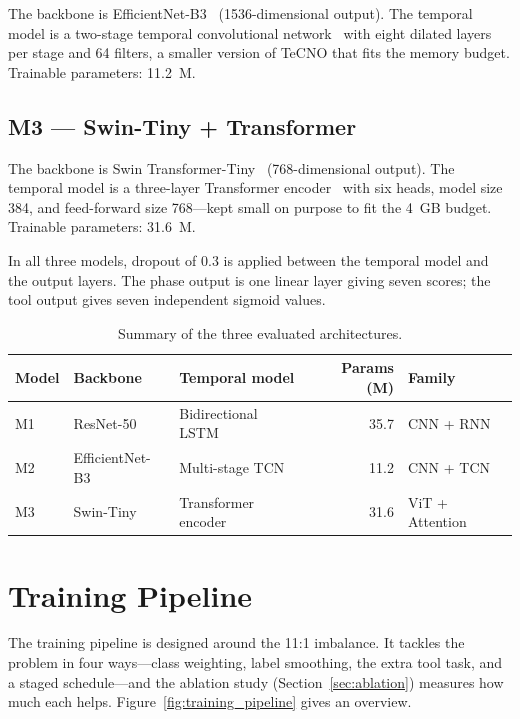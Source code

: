 The backbone is EfficientNet-B3~\cite{tan2019efficientnet} (1536-dimensional output). The temporal model is a two-stage temporal convolutional network~\cite{czempiel2020tecno} with eight dilated layers per stage and 64 filters, a smaller version of TeCNO that fits the memory budget. Trainable parameters: 11.2~M.

\subsection{M3 --- Swin-Tiny + Transformer}

The backbone is Swin Transformer-Tiny~\cite{liu2021swin} (768-dimensional output). The temporal model is a three-layer Transformer encoder~\cite{vaswani2017attention} with six heads, model size 384, and feed-forward size 768---kept small on purpose to fit the 4~GB budget. Trainable parameters: 31.6~M.

In all three models, dropout of 0.3 is applied between the temporal model and the output layers. The phase output is one linear layer giving seven scores; the tool output gives seven independent sigmoid values.

\begin{table}[H]
\centering
\caption{Summary of the three evaluated architectures.}
\label{tab:architectures}
\begin{tabular}{lllrl}
\toprule
\textbf{Model} & \textbf{Backbone} & \textbf{Temporal model} & \textbf{Params (M)} & \textbf{Family} \\
\midrule
M1 & ResNet-50      & Bidirectional LSTM  & 35.7 & CNN + RNN \\
M2 & EfficientNet-B3 & Multi-stage TCN     & 11.2 & CNN + TCN \\
M3 & Swin-Tiny      & Transformer encoder & 31.6 & ViT + Attention \\
\bottomrule
\end{tabular}
\end{table}

\section{Training Pipeline}

The training pipeline is designed around the 11:1 imbalance. It tackles the problem in four ways---class weighting, label smoothing, the extra tool task, and a staged schedule---and the ablation study (Section~\ref{sec:ablation}) measures how much each helps. Figure~\ref{fig:training_pipeline} gives an overview.

